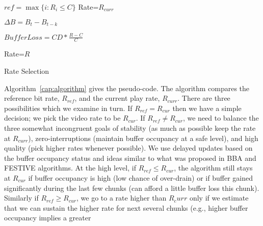 \begin{algorithm} [t]
\SetAlgoLined
${ref} = \max \{i: R_i \le C\}$\;
 {
   Rate=$R_{curr}$
 }
 {
 $\Delta B = B_{t} -B_{t-k}$\;
   \;
 {
 $BufferLoss=CD*\frac{R-C}{C}$\;

 {Rate=$R$}
 }
 }
\caption{Rate Selection} \label{cap:algorithm}
\end{algorithm} 
Algorithm~\ref{cap:algorithm} gives the pseudo-code. 
The algorithm 
compares the reference bit rate, $R_{ref}$, and the current play rate,
$R_{curr}$. There are three possibilities which we examine in turn.
If $R_{ref}= R_{cur}$ then we have a simple decision; we pick the
video rate to be $ R_{cur}$.
If $R_{ref} \neq R_{cur}$, we need to balance the three somewhat
incongruent goals of stability
(as much as possible keep the rate at $R_{curr}$), zero-interruptions
(maintain buffer occupancy at a safe level), and high quality (pick
higher rates whenever possible). 
We use delayed updates \rks{elaborate what this means} 
based on the buffer occupancy status and ideas similar to what
was proposed in BBA \cite{BBA} and FESTIVE \cite{Festive} algorithms. 
At the high level, if $R_{ref} \le R_{cur}$, the algorithm still
stays at $R_{cur}$ if buffer occupancy is high (low chance of
over-drain) or if buffer gained significantly during the last few
chunks (can afford a little buffer loss this chunk). 
Similarly if $R_{ref} \ge R_{cur}$, we go to a rate higher than
$R_curr$ only if we estimate that we can sustain the higher rate for
next several chunks (e.g., higher buffer occupancy implies a greater
